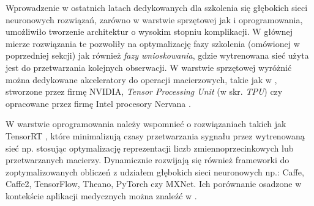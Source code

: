 Wprowadzenie w ostatnich latach dedykowanych dla szkolenia się głębokich sieci neuronowych rozwiązań, zarówno w warstwie sprzętowej jak i oprogramowania, umożliwiło tworzenie architektur o wysokim stopniu komplikacji. W głównej mierze rozwiązania te pozwoliły na optymalizację fazy szkolenia (omówionej w poprzedniej sekcji) jak również \textit{fazy wnioskowania}, gdzie wytrenowana sieć użyta jest do przetwarzania kolejnych obserwacji. W warstwie sprzętowej wyróżnić można dedykowane akceleratory do operacji macierzowych, takie jak w \cite{DBLP:journals/corr/abs-1803-04014}, stworzone przez firmę NVIDIA, \textit{Tensor Processing Unit} (w skr. \textit{TPU}) czy opracowane przez firmę Intel procesory Nervana \cite{Intel}. 

W warstwie oprogramowania należy wspomnieć o rozwiązaniach takich jak TensorRT \cite{TensorRT}, które minimalizują czasy przetwarzania sygnału przez wytrenowaną sieć np. stosując optymalizację reprezentacji liczb zmiennoprzecinkowych lub przetwarzanych macierzy. Dynamicznie rozwijają się również frameworki do zoptymalizowanych obliczeń z udziałem głębokich sieci neuronowych np.: Caffe, Caffe2, TensorFlow, Theano, PyTorch czy MXNet. Ich porównanie osadzone w kontekście aplikacji medycznych można znaleźć w \cite{Erickson2017}.


